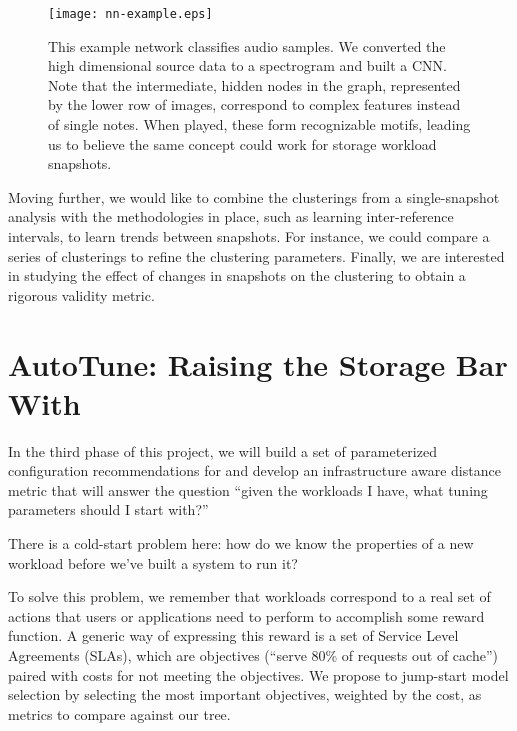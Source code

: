 \begin{figure}
    \centering
    \texttt{[image: nn-example.eps]}
    \caption{This example network classifies audio samples.  We converted the high dimensional source data to a spectrogram and built a CNN.  Note that the intermediate, hidden nodes in the graph, represented by the lower row of images, correspond to complex features instead of single notes.  When played, these form recognizable motifs, leading us to believe the same concept could work for storage workload snapshots.}
    \label{fig:nn}
\end{figure}

Moving further, we would like to combine the clusterings from a single-snapshot
analysis with the methodologies in place, such as learning inter-reference
intervals, to learn trends between snapshots.
For instance, we could compare a
series of clusterings to refine the clustering parameters.  Finally, we are
interested in studying the effect of changes in snapshots on the clustering to
obtain a rigorous validity metric.
\section{AutoTune: Raising the Storage Bar With \Mws}%


In the third phase of this project, we will build a set of parameterized configuration
recommendations for \mws and develop an infrastructure aware distance metric
that will answer the question ``given the workloads I have, what tuning
parameters should I start with?''

There is a cold-start problem here: how do we know the properties of a new
workload before we've built a system to run it?  

To solve this problem, we remember that workloads correspond to a real set of
actions that users or applications need to perform to accomplish some reward
function.  A generic way of expressing this reward is a set of Service Level
Agreements (SLAs), which are objectives (\eg ``serve 80\% of requests out of
cache'') paired with costs for not meeting the objectives.  We propose to
jump-start model selection by selecting the most important objectives, weighted
by the cost, as metrics to compare against our \mws tree.



